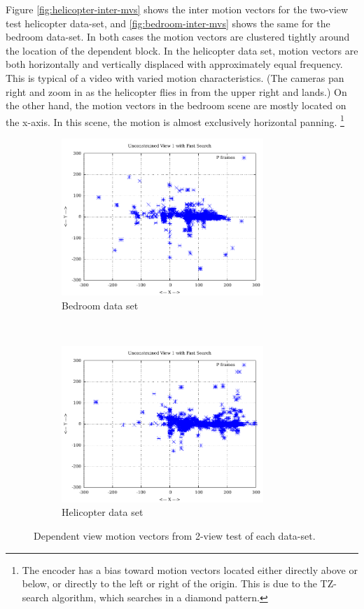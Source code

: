 \documentclass{sig-alternate-05-2015}
\begin{document}
Figure \ref{fig:helicopter-inter-mvs} shows the inter motion vectors for the
two-view test helicopter data-set, and \ref{fig:bedroom-inter-mvs} shows the
same for the bedroom data-set. In both cases the motion vectors are clustered
tightly around the location of the dependent block. In the helicopter data set,
motion vectors are both horizontally and vertically displaced with approximately
equal frequency. This is typical of a video with varied motion characteristics.
(The cameras pan right and zoom in as the helicopter flies in from the upper
right and lands.) On the other hand, the motion vectors in the bedroom scene are
mostly located on the x-axis. In this scene, the motion is almost exclusively
horizontal panning. \footnote{The encoder has a bias toward motion vectors
located either directly above or below, or directly to the left or right of the
origin. This is due to the TZ-search algorithm, which searches in a diamond
pattern.}

\begin{figure}[H]
\centering
\begin{subfigure}{.5\textwidth}
\centering
\includegraphics[width=3in]{figures/bedroom1-inter-view-mvs.pdf}
\caption{Bedroom data set}
\label{fig:bedroom-inter-view-mvs}
\end{subfigure} \\
\begin{subfigure}{.5\textwidth}
\centering
\includegraphics[width=3in]{figures/helicopter-inter-view-mvs.pdf}
\caption{Helicopter data set}
\label{fig:helicopter-inter-view-mvs}
\end{subfigure}
\caption{Dependent view motion vectors from 2-view test of each data-set.}
\label{fig:inter-view-mvs}
\end{figure}
\end{document}
